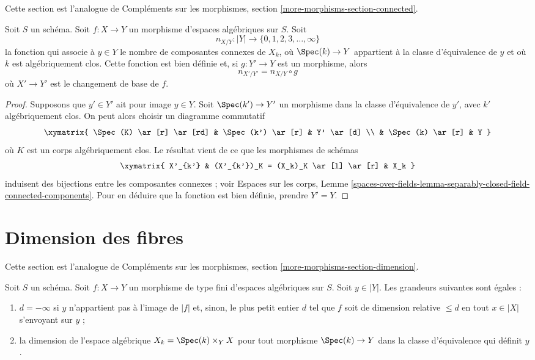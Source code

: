 \noindent
Cette section est l'analogue de
Compléments sur les morphismes, section \ref{more-morphisms-section-connected}.

\begin{lemma}
\label{lemma-base-change-fibres-nr-geometrically-connected-components}
Soit $S$ un schéma.
Soit $f : X \to Y$ un morphisme d'espaces algébriques sur $S$. Soit
$$
n_{X/Y} : |Y| \to \{0, 1, 2, 3, \ldots, \infty\}
$$
la fonction qui associe à $y \in Y$ le nombre de composantes connexes
de $X_k$, où $\Spec(k) \to Y$ appartient à la classe d'équivalence
de $y$ et où $k$ est algébriquement clos.
Cette fonction est bien définie et, si $g : Y' \to Y$ est un morphisme, alors
$$
n_{X'/Y'} = n_{X/Y} \circ g
$$
où $X' \to Y'$ est le changement de base de $f$.
\end{lemma}

\begin{proof}
Supposons que $y' \in Y'$ ait pour image $y \in Y$. Soit $\Spec(k') \to Y'$
un morphisme dans la classe d'équivalence de $y'$, avec $k'$ algébriquement clos.
On peut alors choisir un diagramme commutatif
$$
\xymatrix{
\Spec(K) \ar[r] \ar[rd] &
\Spec(k') \ar[r] & Y' \ar[d] \\
& \Spec(k) \ar[r] & Y
}
$$
où $K$ est un corps algébriquement clos.
Le résultat vient de ce que les morphismes de schémas
$$
\xymatrix{
X'_{k'} & (X'_{k'})_K = (X_k)_K \ar[l] \ar[r] & X_k
}
$$
induisent des bijections entre les composantes connexes ; voir
Espaces sur les corps, Lemme
\ref{spaces-over-fields-lemma-separably-closed-field-connected-components}.
Pour en déduire que la fonction est bien définie, prendre $Y' = Y$.
\end{proof}







\section{Dimension des fibres}
\label{section-dimension}

\noindent
Cette section est l'analogue de
Compléments sur les morphismes, section \ref{more-morphisms-section-dimension}.

\begin{lemma}
\label{lemma-dimension-fibre}
Soit $S$ un schéma. Soit $f : X \to Y$ un morphisme de type fini
d'espaces algébriques sur $S$. Soit $y \in |Y|$. Les grandeurs suivantes
sont égales :
\begin{enumerate}
\item $d = -\infty$ si $y$ n'appartient pas à l'image de $|f|$ et,
sinon, le plus petit entier $d$ tel que $f$ soit de dimension relative $\leq d$
en tout $x \in |X|$ s'envoyant sur $y$ ;
\item la dimension de l'espace algébrique $X_k = \Spec(k) \times_Y X$
pour tout morphisme $\Spec(k) \to Y$ dans la classe d'équivalence qui définit $y$.
\end{enumerate}
\end{lemma}

